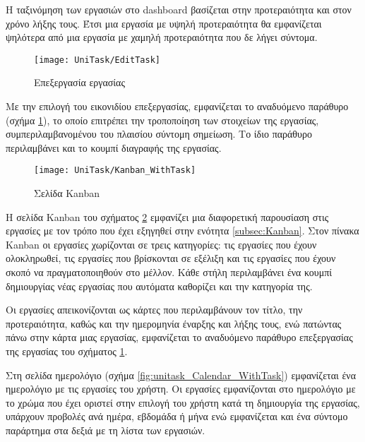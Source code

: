         Η ταξινόμηση των εργασιών στο dashboard βασίζεται στην προτεραιότητα και στον χρόνο λήξης τους. Έτσι μια εργασία με υψηλή προτεραιότητα θα εμφανίζεται ψηλότερα από μια εργασία με χαμηλή προτεραιότητα που δε λήγει σύντομα.

        \begin{figure}[h!] \noindent \centering
            \texttt{[image: UniTask/EditTask]}
            \caption{\centering Επεξεργασία εργασίας}
            \label{fig:unitask_EditTask}
        \end{figure}

        Με την επιλογή του εικονιδίου επεξεργασίας, εμφανίζεται το αναδυόμενο παράθυρο (σχήμα \ref{fig:unitask_EditTask}), το οποίο επιτρέπει την τροποποίηση των στοιχείων της εργασίας, συμπεριλαμβανομένου του πλαισίου {\Zona σύντομη σημείωση}. Το ίδιο παράθυρο περιλαμβάνει και το κουμπί διαγραφής της εργασίας.

        \begin{figure}[h!] \noindent \centering
            \texttt{[image: UniTask/Kanban\_WithTask]}
            \caption{\centering Σελίδα Kanban}
            \label{fig:unitask_Kanban_WithTask}
        \end{figure}

        Η σελίδα {\ZonaSB Kanban} του σχήματος \ref{fig:unitask_Kanban_WithTask} εμφανίζει μια διαφορετική παρουσίαση στις εργασίες με τον τρόπο που έχει εξηγηθεί στην ενότητα \ref{subsec:Kanban}. Στον πίνακα Kanban οι εργασίες χωρίζονται σε τρεις κατηγορίες: τις εργασίες που έχουν ολοκληρωθεί, τις εργασίες που βρίσκονται σε εξέλιξη και τις εργασίες που έχουν σκοπό να πραγματοποιηθούν στο μέλλον. Κάθε στήλη περιλαμβάνει ένα κουμπί δημιουργίας νέας εργασίας που αυτόματα καθορίζει και την κατηγορία της.

        Οι εργασίες απεικονίζονται ως κάρτες που περιλαμβάνουν τον τίτλο, την προτεραιότητα, καθώς και την ημερομηνία έναρξης και λήξης τους, ενώ πατώντας πάνω στην κάρτα μιας εργασίας, εμφανίζεται το αναδυόμενο παράθυρο επεξεργασίας της εργασίας του σχήματος \ref{fig:unitask_EditTask}.

        Στη σελίδα {\ZonaSB ημερολόγιο} (σχήμα \ref{fig:unitask_Calendar_WithTask}) εμφανίζεται ένα ημερολόγιο με τις εργασίες του χρήστη. Οι εργασίες εμφανίζονται στο ημερολόγιο με το χρώμα που έχει οριστεί στην επιλογή του χρήστη κατά τη δημιουργία της εργασίας, υπάρχουν προβολές ανά ημέρα, εβδομάδα ή μήνα ενώ εμφανίζεται και ένα σύντομο παράρτημα στα δεξιά με τη λίστα των εργασιών.

